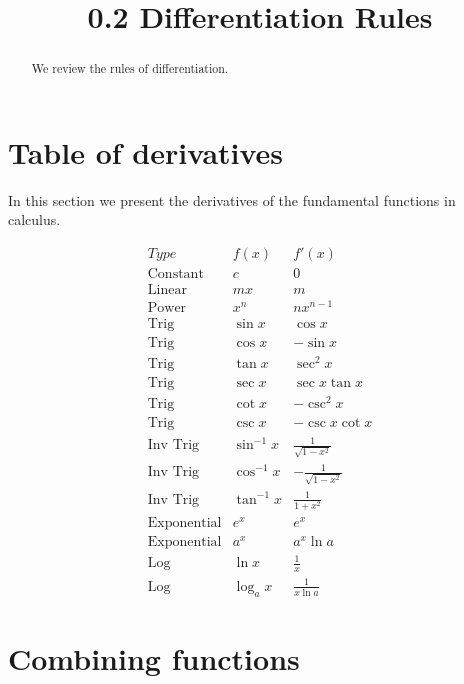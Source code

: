 \documentclass[handout]{ximera}
\title{0.2 Differentiation Rules}
\begin{document}
\begin{abstract}
We review the rules of differentiation.
\end{abstract}

\maketitle


\section{Table of derivatives}

In this section we present the derivatives of the fundamental functions in calculus.  

\begin{center}
\[
\begin{array}{c|c|c}
		Type & f(x) & f'(x)  \\
		\hline
		\text{Constant} & c & 0 \\
		\text{Linear} & mx & m  \\
		\text{Power} & x^n & nx^{n-1}  \\
		\hline
		\text{Trig} & \sin x & \cos x \\
		\text{Trig} & \cos x & -\sin x \\
		\hline
		\text{Trig} & \tan x & \sec^2 x \\
		\text{Trig} & \sec x & \sec x\tan x \\
		\hline
		\text{Trig} & \cot x & -\csc^2 x\ \\
		\text{Trig} & \csc x & -\csc x\cot x \\
		\hline
		\text{Inv Trig} & \sin^{-1} x & \frac{1}{\sqrt{1-x^2}} \\
		\text{Inv Trig} & \cos^{-1} x & -\frac{1}{\sqrt{1-x^2}} \\
		\text{Inv Trig} & \tan^{-1} x & \frac{1}{1+x^2} \\
		\hline
		\text{Exponential} & e^x & e^x \\
		\text{Exponential} & a^x & a^x\ln a \\
		\hline
		\text{Log} & \ln x & \frac{1}{x} \\
		\text{Log} & \log_a x & \frac{1}{x\ln a}
	\end{array}
    \]
\end{center}


\section{Combining functions}
\end{document}
